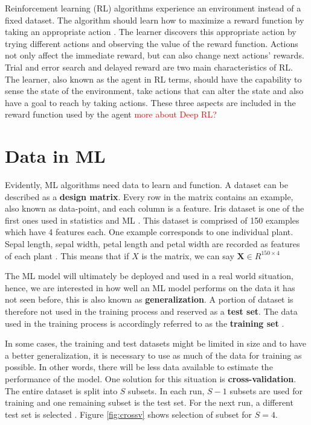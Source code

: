 Reinforcement learning (RL) algorithms experience an environment instead of a fixed dataset. The algorithm should learn how to maximize a reward function by taking an appropriate action \cite{sutton1992introduction}. The learner discovers this appropriate action by trying different actions and observing the value of the reward function. Actions not only affect the immediate reward, but can also change next actions' rewards. Trial and error search and delayed reward are two main characteristics of RL.\\The learner, also known as the agent in RL terms, should have the capability to sense the state of the environment, take actions that can alter the state and also have a goal to reach by taking actions. These three aspects are included in the reward function used by the agent \cite{sutton1992introduction} \textcolor{red}{more about Deep RL?}

\section{Data in ML}

Evidently, ML algorithms need data to learn and function. A dataset can be described as a \textbf{design matrix}. Every row in the matrix contains an example, also known as data-point, and each column is a feature. Iris dataset is one of the first ones used in statistics and ML \cite{Fischer1936Iris}. This dataset is comprised of 150 examples which have 4 features each. One example corresponds to one individual plant. Sepal length, sepal width, petal length and petal width are recorded as features of each plant \cite{Fischer1936Iris}.
This means that if $X$ is the matrix, we can say $\mathbf{X} \in R^{150 \times 4}$

The ML model will ultimately be deployed and used in a real world situation, hence, we are interested in how well an ML model performs on the data it has not seen before, this is also known as \textbf{generalization}. A portion of dataset is therefore not used in the training process and reserved as a \textbf{test set}. The data used in the training process is accordingly referred to as the \textbf{training set} \cite{IanGoodfellow2016}. 

In some cases, the training and test datasets might be limited in size and to have a better generalization, it is necessary to use as much of the data for training as possible. In other words, there will be less data available to estimate the performance of the model. One solution for this situation is \textbf{cross-validation}. The entire dataset is split into ${S}$ subsets. In each run, ${S - 1}$ subsets are used for training and one remaining subset is the test set. For the next run, a different test set is selected \cite{bishop2006pattern}. Figure \ref{fig:crossv} shows selection of subset for ${S = 4}$.

